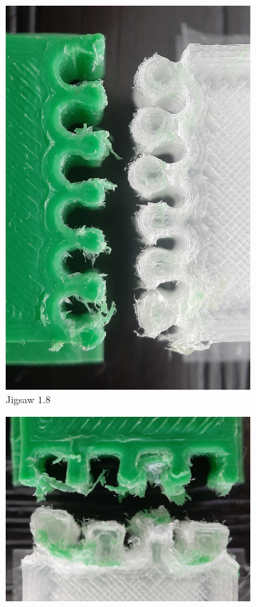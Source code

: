 \begin{figure}
\begin{subfigure}[B]{.18\columnwidth}
		\includegraphics[height=\figheight]{sources-testing-jigsaw_cropped.jpg}
		\caption{Jigsaw $1.8$}
		\label{interlocking:fig:failures_jigsaw}
	\end{subfigure}
	\begin{subfigure}[B]{.22\columnwidth}
		\centering
		\includegraphics[width=\figheight,rotate=90]{sources-testing-suture_wide_cropped.jpg}

\end{subfigure}
\end{figure}
